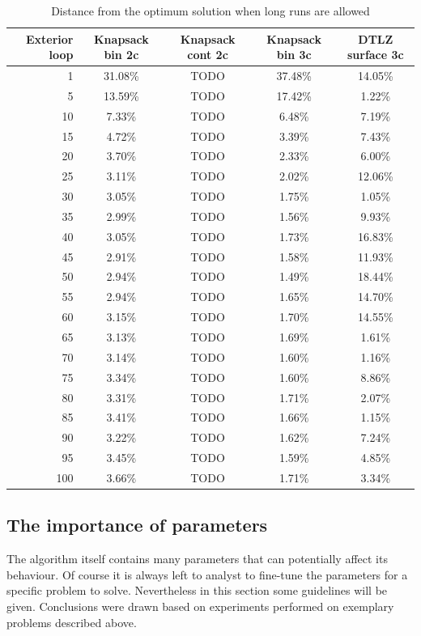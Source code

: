 \begin{table}
  \centering
  \caption{Distance from the optimum solution when long runs are allowed}
  \label{t:opt_dist_long}
  \begin{tabular}{r c c c c}
    \hline
    Exterior loop & Knapsack bin 2c & Knapsack cont 2c & Knapsack bin 3c &
    DTLZ surface 3c \\
    \hline
    \hline
    1 & 31.08\% & TODO & 37.48\% & 14.05\% \\
    5 & 13.59\% & TODO & 17.42\% & 1.22\% \\
    10 & 7.33\% & TODO & 6.48\% & 7.19\% \\
    15 & 4.72\% & TODO & 3.39\% & 7.43\% \\
    20 & 3.70\% & TODO & 2.33\% & 6.00\% \\
    25 & 3.11\% & TODO & 2.02\% & 12.06\% \\
    30 & 3.05\% & TODO & 1.75\% & 1.05\% \\
    35 & 2.99\% & TODO & 1.56\% & 9.93\% \\
    40 & 3.05\% & TODO & 1.73\% & 16.83\% \\
    45 & 2.91\% & TODO & 1.58\% & 11.93\% \\
    50 & 2.94\% & TODO & 1.49\% & 18.44\% \\
    55 & 2.94\% & TODO & 1.65\% & 14.70\% \\
    60 & 3.15\% & TODO & 1.70\% & 14.55\% \\
    65 & 3.13\% & TODO & 1.69\% & 1.61\% \\
    70 & 3.14\% & TODO & 1.60\% & 1.16\% \\
    75 & 3.34\% & TODO & 1.60\% & 8.86\% \\
    80 & 3.31\% & TODO & 1.71\% & 2.07\% \\
    85 & 3.41\% & TODO & 1.66\% & 1.15\% \\
    90 & 3.22\% & TODO & 1.62\% & 7.24\% \\
    95 & 3.45\% & TODO & 1.59\% & 4.85\% \\
    100 & 3.66\% & TODO & 1.71\% & 3.34\% \\
    \hline
  \end{tabular}
\end{table}

\clearpage{}
\subsection{The importance of parameters}

The algorithm itself contains many parameters that can potentially affect its
behaviour. Of course it is always left to analyst to fine-tune the parameters
for a specific problem to solve. Nevertheless in this section some guidelines
will be given. Conclusions were drawn based on experiments performed on
exemplary problems described above.

